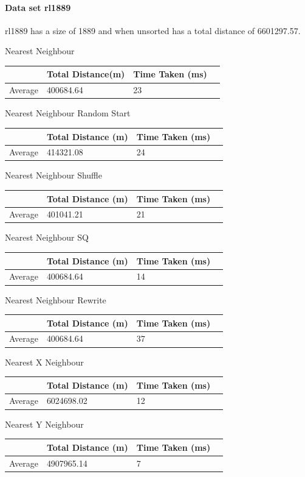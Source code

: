 \documentclass[conference,backref=page]{acmsiggraph}
\begin{document}
\paragraph{Data set rl1889} \hfill

rl1889 has a size of 1889 and when unsorted has a total distance of 6601297.57.

\begin{center}	
	
	Nearest Neighbour
	\begin{tabular}{| l | l | l | l |}
		\hline
		& Total Distance(m)& Time Taken (ms)\\ \hline
		Average & 400684.64 & 23 \\ \hline
	\end{tabular}
	
	Nearest Neighbour Random Start
	\begin{tabular}{| l | l | l | l |}
		\hline
		& Total Distance (m) & Time Taken (ms)\\ \hline
		Average & 414321.08 & 24 \\ \hline
	\end{tabular}
	
	Nearest Neighbour Shuffle
	\begin{tabular}{| l | l | l | l |}
		\hline
		& Total Distance (m) & Time Taken (ms)\\ \hline
		Average & 401041.21 & 21 \\ \hline
	\end{tabular}
	
	Nearest Neighbour SQ
	\begin{tabular}{| l | l | l | l |}
		\hline
		& Total Distance (m) & Time Taken (ms)\\ \hline
		Average & 400684.64 & 14 \\ \hline
	\end{tabular}
	
	Nearest Neighbour Rewrite
	\begin{tabular}{| l | l | l | l |}
		\hline
		& Total Distance (m) & Time Taken (ms)\\ \hline
		Average & 400684.64 & 37 \\ \hline
	\end{tabular}
	
	
	Nearest X Neighbour	
	\begin{tabular}{| l | l | l | l |}
		\hline
		& Total Distance (m) & Time Taken (ms)\\ \hline
		Average & 6024698.02 & 12 \\ \hline	
	\end{tabular}
	
	Nearest Y Neighbour	
	\begin{tabular}{| l | l | l | l |}
		\hline
		& Total Distance (m) & Time Taken (ms)\\ \hline
		Average & 4907965.14 & 7 \\ \hline
	\end{tabular}
\end{center}
\end{document}
